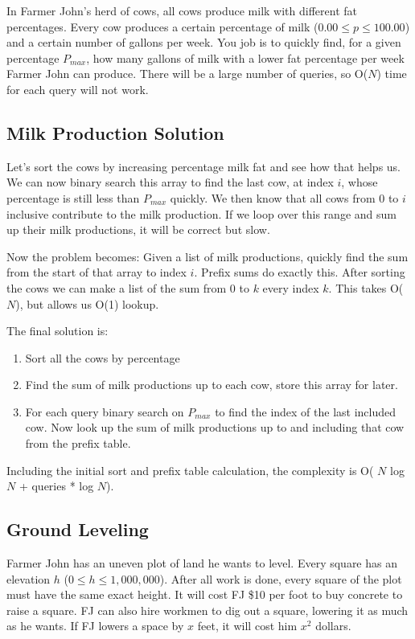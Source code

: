 \documentclass[11pt]{article}
\begin{document}
In Farmer John's herd of cows, all cows produce milk with different fat percentages.  Every cow produces a certain percentage of milk ($0.00\leq p\leq100.00$) and a certain number of gallons per week.  You job is to quickly find, for a given percentage $P_{max}$, how many gallons of milk with a lower fat percentage per week Farmer John can produce.  There will be a large number of queries, so O($N$) time for each query will not work.

\subsection{Milk Production Solution}

Let's sort the cows by increasing percentage milk fat and see how that helps us.  We can now binary search this array to find the last cow, at index $i$, whose percentage is still less than $P_{max}$ quickly.  We then know that all cows from 0 to $i$ inclusive contribute to the milk production.  If we loop over this range and sum up their milk productions, it will be correct but slow.

Now the problem becomes: Given a list of milk productions, quickly find the sum from the start of that array to index $i$.  Prefix sums do exactly this.  After sorting the cows we can make a list of the sum from 0 to $k$ every index $k$.  This takes O($N$), but allows us O(1) lookup.

The final solution is:

\begin{enumerate}
    \item Sort all the cows by percentage
    \item Find the sum of milk productions up to each cow, store this array for later.
    \item For each query binary search on $P_{max}$ to find the index of the last included cow.  Now look up the sum of milk productions up to and including that cow from the prefix table.
\end{enumerate}

Including the initial sort and prefix table calculation, the complexity is O( $N$ log $N$ + queries * log $N$).

\subsection{Ground Leveling}
Farmer John has an uneven plot of land he wants to level.  Every square has an elevation $h$ ($0\leq h\leq1,000,000$).  After all work is done, every square of the plot must have the same exact height.  It will cost FJ \$10 per foot to buy concrete to raise a square.  FJ can also hire workmen to dig out a square, lowering it as much as he wants.  If FJ lowers a space by $x$ feet, it will cost him $x^2$ dollars.
\end{document}
